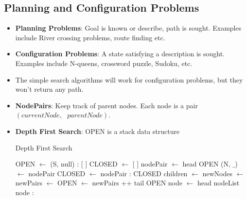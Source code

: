 \documentclass[a4paper]{article}
\begin{document}
\subsection{Planning and Configuration Problems}
\begin{itemize}
    \item \textbf{Planning Problems}: Goal is known or describe, path is sought. Examples include River crossing problems, route finding etc.
    \item \textbf{Configuration Problems}: A state satisfying a description is sought. Examples include N-queens, crossword puzzle, Sudoku, etc.
    \item The simple search algorithms will work for configuration problems, but they won't return any path.
    \item \textbf{NodePairs}: Keep track of parent nodes. Each node is a pair $(currentNode,\text{ }parentNode)$.
    \item \textbf{Depth First Search}: OPEN is a stack data structure
    \begin{algorithm}[H]
        \caption{Depth First Search}\label{alg:AI-DFS}
        \begin{algorithmic}[1]
            \State OPEN $\gets$ (S, null) : [ ]
            \State CLOSED $\gets$ [ ]
                \State nodePair $\gets$ head OPEN
                \State (N, $\_$) $\gets$ nodePair
                    \State \Return {}
                \EndIf
                \State CLOSED $\gets$ nodePair : CLOSED
                \State children $\gets$ 
                \State newNodes $\gets$ 
                \State newPairs $\gets$ 
                \State OPEN $\gets$ newPairs ++ tail OPEN
            \EndWhile
            \State \Return [ ]
            \Statex
                    \State \Return [ ]
                \EndIf
                \State node $\gets$ head nodeList
                    \State \Return {}
                \EndIf
                \State \Return node : 
            \EndFunction
            \Statex

\end{algorithmic}
\end{algorithm}
\end{itemize}
\end{document}
